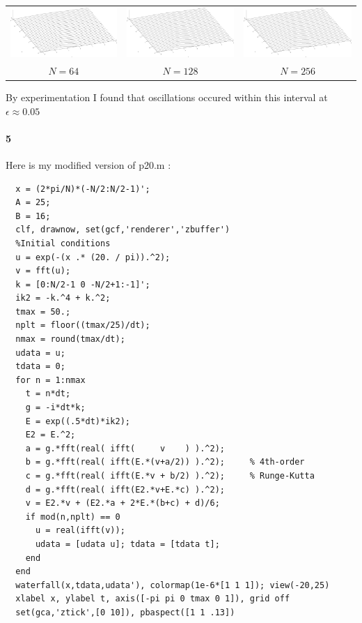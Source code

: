 \documentclass{article}
\begin{document}
\begin{center}
\begin{tabular}{ccc}
\includegraphics[width=2in]{plot4_1.png} &
\includegraphics[width=2in]{plot4_2.png} &
\includegraphics[width=2in]{plot4_3.png} \\
$N = 64$ & $N = 128$ & $N = 256$ \\
\end{tabular}
\end{center}

By experimentation I found that oscillations occured within this interval at $\epsilon \approx 0.05$

\paragraph{5}

Here is my modified version of p20.m :

\begin{verbatim}
  x = (2*pi/N)*(-N/2:N/2-1)';
  A = 25; 
  B = 16; 
  clf, drawnow, set(gcf,'renderer','zbuffer')
  %Initial conditions
  u = exp(-(x .* (20. / pi)).^2);
  v = fft(u); 
  k = [0:N/2-1 0 -N/2+1:-1]'; 
  ik2 = -k.^4 + k.^2;
  tmax = 50.; 
  nplt = floor((tmax/25)/dt); 
  nmax = round(tmax/dt);
  udata = u; 
  tdata = 0; 
  for n = 1:nmax
    t = n*dt; 
    g = -i*dt*k;
    E = exp((.5*dt)*ik2); 
    E2 = E.^2;
    a = g.*fft(real( ifft(     v    ) ).^2);
    b = g.*fft(real( ifft(E.*(v+a/2)) ).^2);     % 4th-order
    c = g.*fft(real( ifft(E.*v + b/2) ).^2);     % Runge-Kutta
    d = g.*fft(real( ifft(E2.*v+E.*c) ).^2);
    v = E2.*v + (E2.*a + 2*E.*(b+c) + d)/6;
    if mod(n,nplt) == 0 
      u = real(ifft(v));
      udata = [udata u]; tdata = [tdata t];
    end
  end
  waterfall(x,tdata,udata'), colormap(1e-6*[1 1 1]); view(-20,25)
  xlabel x, ylabel t, axis([-pi pi 0 tmax 0 1]), grid off
  set(gca,'ztick',[0 10]), pbaspect([1 1 .13])
\end{verbatim}
\end{document}
